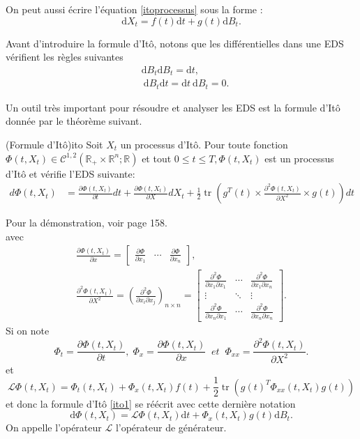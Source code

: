 \documentclass[12pt,a4paper]{report}%
\begin{document}
On peut aussi écrire l'équation \eqref{itoprocessus} sous la forme :
$$
\mathrm{d} X_t=f(t) \mathrm{d} t+g(t) \mathrm{d} B_t .
$$

Avant d'introduire la formule d'Itô, notons que les différentielles dans une EDS vérifient les règles suivantes 
$$
\begin{aligned}
& \mathrm{d} B_t \mathrm{d} B_t=\mathrm{d} t, \\
& \mathrm{~d} B_t \mathrm{d} t=\mathrm{d} t \mathrm{~d} B_t=0 .
\end{aligned}
$$

Un outil très important pour résoudre et analyser les EDS est la formule d'Itô donnée par le théorème suivant.

\begin{théorème}{(Formule d'Itô)}{ito}
Soit $X_t$ un processus d'Itô. Pour toute fonction $\Phi(t, X_t) \in \mathcal{C}^{1,2}\left(\mathbb{R}_{+} \times \mathbb{R}^n ; \mathbb{R}\right)$ et tout $0 \leqslant t \leqslant T, \Phi(t, X_t)$ est un processus d'Itô et vérifie l'EDS suivante:
\begin{equation}\label{ito1}
\begin{aligned}
d \Phi(t, X_t)&=\frac{\partial\Phi(t, X_t)}{\partial t}d t+\frac{\partial\Phi(t, X_t)}{\partial X} d X_t +\frac{1}{2} \operatorname{tr}\left(g^T(t) \times\frac{\partial^2\Phi(t, X_t)}{\partial X^2}\times g(t)\right)dt
\end{aligned}
\end{equation}
\end{théorème}
Pour la démonstration, voir \cite{c} page 158.\\
avec
$$
\begin{gathered}
 \frac{\partial\Phi(t, X_t)}{\partial x}=\left[\begin{array}{lll}
\frac{\partial \Phi}{\partial x_1} & \cdots & \frac{\partial \Phi}{\partial x_n}
\end{array}\right], \\
\frac{\partial^2\Phi(t, X_t)}{\partial X^2}=\left(\frac{\partial^2 \Phi}{\partial x_i \partial x_j}\right)_{n \times n}=\left[\begin{array}{ccc}
\frac{\partial^2 \Phi}{\partial x_1 \partial x_1} & \cdots & \frac{\partial^2 \Phi}{\partial x_1 \partial x_n} \\
\vdots & \ddots & \vdots \\
\frac{\partial^2 \Phi}{\partial x_n \partial x_1} & \cdots & \frac{\partial^2 \Phi}{\partial x_n \partial x_n}
\end{array}\right] .
\end{gathered}
$$
Si on note 
$$
\Phi_t=\frac{\partial\Phi(t, X_t)}{\partial t},\; \Phi_x=\frac{\partial\Phi(t, X_t)}{\partial x}\;\;et\;\;\Phi_{x x}=\frac{\partial^2\Phi(t, X_t)}{\partial X^2}.
$$ 
et 
$$
\mathcal{L} \Phi(t,X_t)=\Phi_t(t, X_t)+\Phi_x(t, X_t) f(t)+\frac{1}{2} \operatorname{tr}\left(g(t)^T \Phi_{x x}(t, X_t) g(t)\right)
$$
et donc la formule d'Itô \eqref{ito1} se réécrit avec cette dernière notation
$$
\mathrm{d} \Phi(t, X_t)=\mathcal{L} \Phi(t,X_t) \mathrm{d} t+\Phi_x(t, X_t) g(t) \mathrm{d} B_t .
$$
On appelle l'opérateur \( \mathcal{L} \) l'opérateur de générateur.
\end{document}
